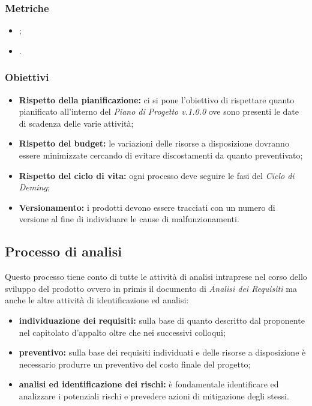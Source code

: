 \subsubsection{Metriche}

\begin{itemize}
    \item {};
    \item {}.
\end{itemize}

\subsubsection{Obiettivi}
\begin{itemize}
    \item \textbf{Rispetto della pianificazione:} ci si pone l'obiettivo di rispettare quanto pianificato all'interno del \textit{Piano di Progetto v.1.0.0}
          ove sono presenti le date di scadenza delle varie attività;
    \item \textbf{Rispetto del budget:} le variazioni delle risorse a disposizione dovranno essere minimizzate cercando di evitare discostamenti da quanto preventivato;
    \item \textbf{Rispetto del ciclo di vita:} ogni processo deve seguire le fasi del \textit{Ciclo di Deming};
    \item \textbf{Versionamento:} i prodotti devono essere tracciati con un numero di versione al fine di individuare le cause di malfunzionamenti.
\end{itemize}

\subsection{Processo di analisi}
Questo processo tiene conto di tutte le attività di analisi intraprese nel corso dello sviluppo del prodotto ovvero in primis il documento di \textit{Analisi dei Requisiti}
ma anche le altre attività di identificazione ed analisi:

\begin{itemize}
    \item  \textbf{individuazione dei requisiti:} sulla base di quanto descritto dal proponente nel capitolato d'appalto oltre che nei successivi colloqui;
    \item \textbf{preventivo:} sulla base dei requisiti individuati e delle risorse a disposizione è necessario produrre un preventivo del costo finale del progetto;
    \item \textbf{analisi ed identificazione dei rischi:} è fondamentale identificare ed analizzare i potenziali rischi e prevedere azioni di mitigazione degli stessi.
\end{itemize}

